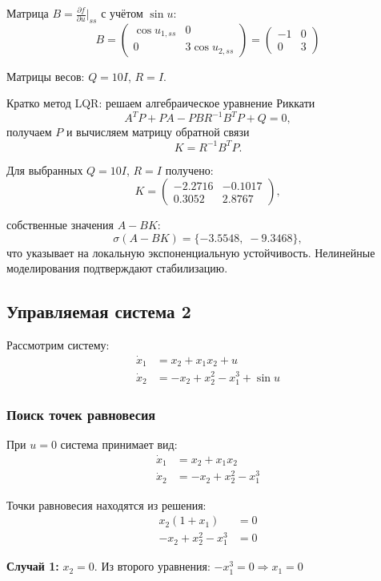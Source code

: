 Матрица $B = \frac{\partial f}{\partial u}\big|_{ss}$ с учётом $\sin u$:
$$B = \begin{pmatrix} \cos u_{1,ss} & 0 \\ 0 & 3\cos u_{2,ss} \end{pmatrix} = \begin{pmatrix} -1 & 0 \\ 0 & 3 \end{pmatrix}$$

Матрицы весов: $Q = 10I$, $R = I$.

Кратко метод LQR: решаем алгебраическое уравнение Риккати
$$A^T P + PA - PBR^{-1}B^T P + Q = 0,$$
получаем $P$ и вычисляем матрицу обратной связи
$$K = R^{-1}B^T P.$$

Для выбранных $Q=10I$, $R=I$ получено:
$$K = \begin{pmatrix}
-2.2716 & -0.1017 \\
0.3052 & 2.8767
\end{pmatrix},$$

собственные значения $A - BK$:
$$\sigma(A-BK) = \{-3.5548,\;-9.3468\},$$
что указывает на локальную экспоненциальную устойчивость. Нелинейные моделирования подтверждают стабилизацию.


\subsection*{Управляемая система 2}

Рассмотрим систему:
\begin{align}
\dot{x}_1 &= x_2 + x_1 x_2 + u \\
\dot{x}_2 &= -x_2 + x_2^2 - x_1^3 + \sin u
\end{align}

\subsubsection*{Поиск точек равновесия}

При $u = 0$ система принимает вид:
\begin{align}
\dot{x}_1 &= x_2 + x_1 x_2 \\
\dot{x}_2 &= -x_2 + x_2^2 - x_1^3
\end{align}

Точки равновесия находятся из решения:
\begin{align}
x_2(1 + x_1) &= 0 \\
-x_2 + x_2^2 - x_1^3 &= 0
\end{align}

\textbf{Случай 1:} $x_2 = 0$. Из второго уравнения: $-x_1^3 = 0 \Rightarrow x_1 = 0$


